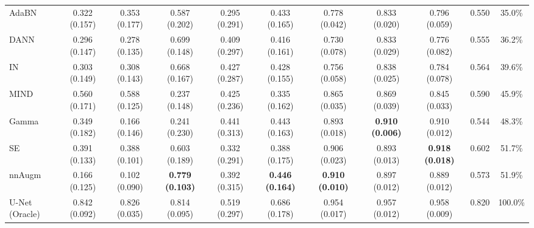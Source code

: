 \begin{landscape}
\begin{table}[h]
\begin{tabular}{lcccccccccc}
			AdaBN \cite{adabn} & 0.322 (0.157) & 0.353 (0.177) & 0.587 (0.202) & 0.295 (0.291) & 0.433 (0.165) & 0.778 (0.042) & 0.833 (0.020) & 0.796 (0.059) & 0.550 & 35.0\% \\
			
			DANN \cite{dann_medim} & 0.296 (0.147) & 0.278 (0.135) & 0.699 (0.148) & 0.409 (0.297) & 0.416 (0.161) & 0.730 (0.078) & 0.833 (0.029) & 0.776 (0.082) & 0.555 & 36.2\% \\
			
			IN \cite{instance_norm} & 0.303 (0.149) & 0.308 (0.143) & 0.668 (0.167) & 0.427 (0.287) & 0.428 (0.155) & 0.756 (0.058) & 0.838 (0.025) & 0.784 (0.078) & 0.564 & 39.6\% \\
			
			MIND \cite{dg_tta} & 0.560 (0.171) & 0.588 (0.125) & 0.237 (0.148) & 0.425 (0.236) & 0.335 (0.162) & 0.865 (0.035) & 0.869 (0.039) & 0.845 (0.033) & 0.590 & 45.9\% \\
			
			Gamma          & 0.349 (0.182) & 0.166 (0.146) & 0.241 (0.230) & 0.441 (0.313) & 0.443 (0.163) & 0.893 (0.018) & \textbf{0.910 (0.006)} & 0.910 (0.012) & 0.544 & 48.3\% \\
			
			SE \cite{se_medim} & 0.391 (0.133) & 0.388 (0.101) & 0.603 (0.189) & 0.332 (0.291) & 0.388 (0.175) & 0.906 (0.023) & 0.893 (0.013) & \textbf{0.918 (0.018)} & 0.602 & 51.7\% \\
			
			nnAugm \cite{nnunet} & 0.166 (0.125) & 0.102 (0.090) & \textbf{0.779 (0.103)} & 0.392 (0.315) & \textbf{0.446 (0.164)} & \textbf{0.910 (0.010)} & 0.897 (0.012) & 0.889 (0.012) & 0.573 & 51.9\% \\
			
			\midrule
			
			U-Net (Oracle)        & 0.842 (0.092) & 0.826 (0.035) & 0.814 (0.095) & 0.519 (0.297) & 0.686 (0.178) & 0.954 (0.017) & 0.957 (0.012) & 0.958 (0.009) & 0.820 & 100.0\% \\
			
			\bottomrule
			
	\end{tabular}%
	
\end{table}
\end{landscape}

